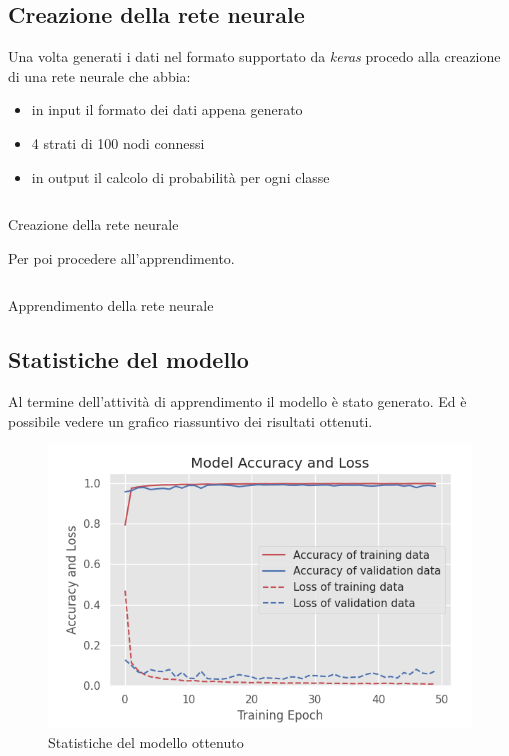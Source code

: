 \subsection{Creazione della rete neurale}
Una volta generati i dati nel formato supportato da \textit{keras} procedo alla creazione di 
una rete neurale che abbia:
\begin{itemize}
    \item in input il formato dei dati appena generato
    \item 4 strati di 100 nodi connessi
    \item in output il calcolo di probabilità per ogni classe
\end{itemize}
\begin{listing}[H] 
    \inputminted[frame=single,framesep=10pt]{python}{assets/snippets/classifier/dnn_create.py}
    \caption{Creazione della rete neurale}
\end{listing}
Per poi procedere all'apprendimento.
\begin{listing}[H] 
    \inputminted[frame=single,framesep=10pt]{python}{assets/snippets/classifier/dnn_fit.py}
    \caption{Apprendimento della rete neurale}
\end{listing}


\newpage
\subsection{Statistiche del modello}
Al termine dell'attività di apprendimento il modello è stato generato. Ed è possibile vedere un grafico 
riassuntivo dei risultati ottenuti.
\begin{figure}[H]
    \centering
    \includegraphics[scale = 0.80]{assets/images/classifications/accelerometer/right_hand/model-right-hand-acc.png}
    \caption{Statistiche del modello ottenuto}
\end{figure}


